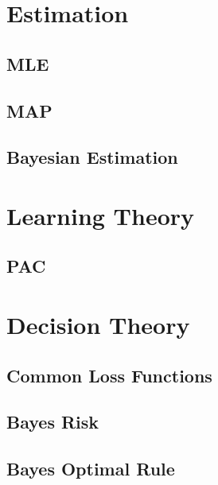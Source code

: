 \documentclass[18pt,a3paper,landscape, ncols=3]{cheatsheet}
\begin{document}
\section{Estimation} \seperator
	\subsection{MLE}
		\begin{mdframed}
		\end{mdframed}
	\subsection{MAP}
		\begin{mdframed}
		\end{mdframed}
	\subsection{Bayesian Estimation}
		\begin{mdframed}
		\end{mdframed}

\section{Learning Theory} \seperator
	\subsection{PAC}
		\begin{mdframed}
		\end{mdframed}
		
\section{Decision Theory} \seperator
	\subsection{Common Loss Functions}
		\begin{mdframed}
		\end{mdframed}
	\subsection{Bayes Risk}
		\begin{mdframed}
		\end{mdframed}
	\subsection{Bayes Optimal Rule}
		\begin{mdframed}
		\end{mdframed}
\end{document}
